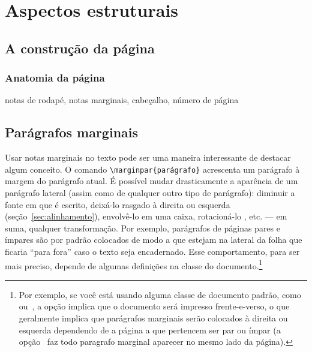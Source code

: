 \section{Aspectos estruturais}

\subsection{A construção da página}
\subsubsection{Anatomia da página}

notas de rodapé, notas marginais, cabeçalho, número de página

\subsection{Parágrafos marginais}
\newcommand{\amounttorotate}{0}\newlength{\recuo}
Usar  notas
marginais no texto pode ser uma maneira interessante de destacar algum
conceito. O comando \verb'\marginpar{parágrafo}' acrescenta um
parágrafo à margem do parágrafo atual. É possível mudar drasticamente
a aparência de um parágrafo lateral (assim como de qualquer outro tipo
de parágrafo): diminuir a fonte em que é escrito, deixá-lo rasgado à
direita ou esquerda (seção~\ref{sec:alinhamento}),
envolvê-lo em uma caixa,
rotacioná-lo%
\marginpar{%
  \ifthenelse{\isodd{\thepage}}%
             {\raggedright\renewcommand{\amounttorotate}{-90}\setlength{\recuo}{-1em}}%
             {\raggedleft\renewcommand{\amounttorotate}{90}\setlength{\recuo}{-1em}}%
  \rotatebox{\amounttorotate}{\hspace{\recuo}\footnotesize\it $\mathcal{A}$ssim.}},
etc. --- em suma, qualquer transformação. Por exemplo, parágrafos de
páginas pares e ímpares são por padrão colocados de modo a que estejam
na lateral da folha que ficaria ``para fora'' caso o texto seja
encadernado. Esse comportamento, para ser mais preciso, depende de
algumas definições na classe do documento.\footnote{Por exemplo, se
  você está usando alguma  classe de documento padrão,
  como~ ou~, a opção
   implica que o documento será impresso
  frente-e-verso, o que geralmente implica que parágrafos marginais
  serão colocados à direita ou esquerda dependendo de a página a que
  pertencem ser par ou ímpar (a opção~ faz todo
  paragrafo marginal aparecer no mesmo lado da página).}


